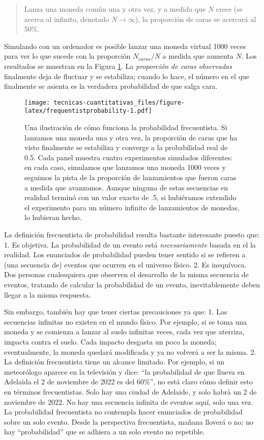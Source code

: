 \documentclass[
]{book}
\begin{document}
\begin{quote}
Lanza una moneda común una y otra vez, y a medida que \(N\) crece (se acerca al infinito, denotado \(N\rightarrow\infty\)), la proporción de caras se acercará al 50\%.
\end{quote}

Simulando con un ordenador es posible lanzar una moneda virtual 1000 veces para ver lo que sucede con la proporción \(N_{caras}/N\) a medida que aumenta \(N\). Los resultados se muestran en la Figura \ref{fig:frequentistprobability}. La \emph{proporción de caras observadas} finalmente deja de fluctuar y se estabiliza; cuando lo hace, el número en el que finalmente se asienta es la verdadera probabilidad de que salga cara.

\begin{figure}
\centering
\texttt{[image: tecnicas-cuantitativas\_files/figure-latex/frequentistprobability-1.pdf]}
\caption{\label{fig:frequentistprobability}Una ilustración de cómo funciona la probabilidad frecuentista. Si lanzamos una moneda una y otra vez, la proporción de caras que ha visto finalmente se estabiliza y converge a la probabilidad real de 0.5. Cada panel muestra cuatro experimentos simulados diferentes: en cada caso, simulamos que lanzamos una moneda 1000 veces y seguimos la pista de la proporción de lanzamientos que fueron caras a medida que avanzamos. Aunque ninguna de estas secuencias en realidad terminó con un valor exacto de .5, si hubiéramos extendido el experimento para un número infinito de lanzamientos de monedas, lo hubieran hecho.}
\end{figure}

La definición frecuentista de probabilidad resulta bastante interesante puesto que:
1. Es objetiva. La probabilidad de un evento está \emph{necesariamente} basada en el la realidad. Los enunciados de probabilidad pueden tener sentido si se refieren a (una secuencia de) eventos que ocurren en el universo físico.
2. Es inequívoca. Dos personas cualesquiera que observen el desarrollo de la misma secuencia de eventos, tratando de calcular la probabilidad de un evento, inevitablemente deben llegar a la misma respuesta.

Sin embargo, también hay que tener ciertas precauciones ya que:
1. Las secuencias infinitas no existen en el mundo físico. Por ejemplo, si se toma una moneda y se comienza a lanzar al suelo infinitas veces, cada vez que aterriza, impacta contra el suelo. Cada impacto desgasta un poco la moneda; eventualmente, la moneda quedará modificada y ya no volverá a ser la misma.
2. La definición frecuentista tiene un alcance limitado. Por ejemplo, si un meteorólogo aparece en la televisión y dice: ``la probabilidad de que llueva en Adelaida el 2 de noviembre de 2022 es del 60\%'', no está claro cómo definir esto en términos frecuentistas. Solo hay una ciudad de Adelaide, y solo habrà un 2 de noviembre de 2022. No hay una secuencia infinita de eventos aquí, solo una vez. La probabilidad frecuentista no contempla hacer enunciados de probabilidad sobre un solo evento. Desde la perspectiva frecuentista, mañana lloverá o no; no hay ``probabilidad'' que se adhiera a un solo evento no repetible.
\end{document}
